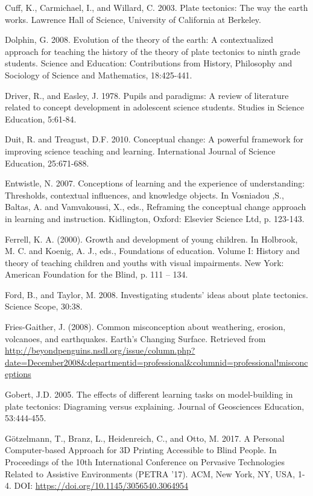 \documentclass[11.5pt]{sig-alternate} %
\begin{document}
Cuff, K., Carmichael, I., and Willard, C. 2003.  Plate tectonics: The way the earth works. Lawrence Hall of Science, University of California at Berkeley.

Dolphin, G. 2008. Evolution of the theory of the earth: A contextualized approach for teaching the history of the theory of plate tectonics to ninth grade students. Science and Education: Contributions from History, Philosophy and Sociology of Science and Mathematics, 18:425-441.

Driver, R., and Easley, J. 1978.  Pupils and paradigms:  A review of literature related to concept development in adolescent science students.  Studies in Science Education, 5:61-84.

Duit, R. and Treagust, D.F. 2010. Conceptual change: A powerful framework for improving science teaching and learning. International Journal of Science Education, 25:671-688.

Entwistle, N. 2007.  Conceptions of learning and the experience of understanding: Thresholds, contextual influences, and knowledge objects. In Vosniadou ,S., Baltas, A. and Vamvakoussi, X., eds., Reframing the conceptual change approach in learning and instruction.  Kidlington, Oxford:  Elsevier Science Ltd, p. 123-143.

Ferrell, K. A. (2000). Growth and development of young children. In Holbrook, M. C. and Koenig, A. J., eds., Foundations of education. Volume I: History and theory of teaching children and youths with visual impairments.  New York: American Foundation for the Blind, p. 111 – 134.

Ford, B., and Taylor, M. 2008. Investigating students' ideas about plate tectonics. Science Scope, 30:38.

Fries-Gaither, J. (2008). Common misconception about weathering, erosion, volcanoes, and earthquakes.  Earth’s Changing Surface. Retrieved from \url{http://beyondpenguins.nsdl.org/issue/column.php?date=December2008&departmentid=professional&columnid=professional!misconceptions}

Gobert, J.D. 2005.  The effects of different learning tasks on model-building in plate tectonics:  Diagraming versus explaining.  Journal of Geosciences Education, 53:444-455.

Götzelmann, T., Branz, L., Heidenreich, C., and Otto, M. 2017. A Personal Computer-based Approach for 3D Printing Accessible to Blind People. In Proceedings of the 10th International Conference on Pervasive Technologies Related to Assistive Environments (PETRA '17). ACM, New York, NY, USA, 1-4. DOI: \url{https://doi.org/10.1145/3056540.3064954}
\end{document}
